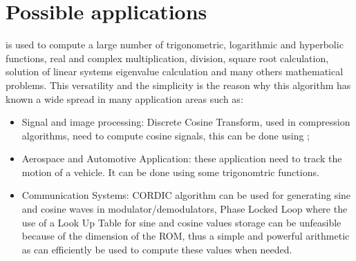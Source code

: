 \section{Possible applications}\label{sec:applications}
\cordic{} is used to compute a large number of trigonometric, logarithmic and 
hyperbolic functions, real and complex multiplication, division, square root
calculation, solution of linear systems eigenvalue calculation and many others
mathematical problems.
This versatility and the simplicity is the reason why this algorithm has known a
wide spread in many application areas such as:
\begin{itemize}
	\item Signal and image processing: Discrete Cosine Transform, used in
		compression algorithms, need to compute cosine signals, this can
		be done using \cordic{};
	\item Aerospace and Automotive Application: these application need to 
		track the motion of a vehicle. It can be done using some
		trigonomtric functions.
	\item Communication Systems: CORDIC algorithm can be used for generating
		sine and cosine waves in modulator/demodulators, Phase Locked
		Loop where the use of a Look Up Table for sine and cosine values
		storage can be unfeasible because of the dimension of the ROM,
		thus a simple and powerful arithmetic as \cordic{} can
		efficiently be used to compute these values when needed.
\end{itemize}
